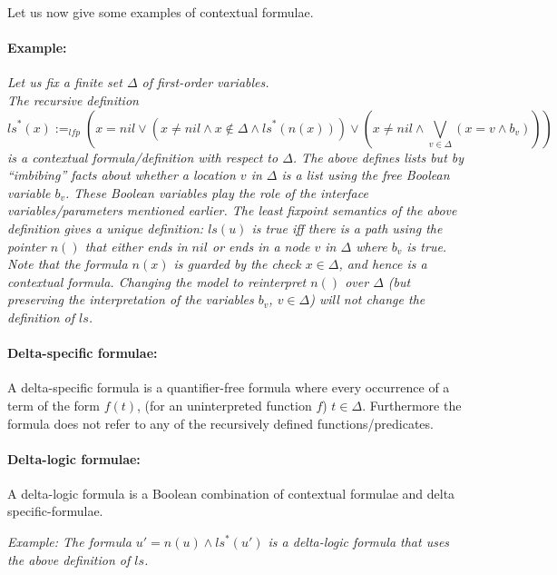 \noindent Let us now give some examples of contextual formulae.

\paragraph{Example:}
\emph{
Let us fix a finite set $\Delta$ of first-order variables.\\
The recursive definition $$\textit{ls}^*(x) :=_{\textit{lfp}} (x=\textit{nil} \vee (x \not = nil \wedge x \not \in \Delta \wedge \textit{ls}^*(n(x))) 
 \vee (x \not = nil \wedge \bigvee_{v \in \Delta} (x\!=\!v \wedge b_v)))$$ 
 is a contextual formula/definition with respect to $\Delta$.
The above defines lists but by ``imbibing'' facts about whether a location $v$ in $\Delta$ is a list using the
free Boolean variable $b_v$. These Boolean variables play the role of the interface variables/parameters mentioned earlier.
The least fixpoint semantics of the above definition gives a unique definition: $ls(u)$ is true iff
there is a path using the pointer $n()$ that either ends in $\textit{nil}$ or ends in a node $v$ in $\Delta$ where $b_v$ is true. 
Note that the formula $n(x)$ is guarded by the check $x \in \Delta$, and hence is a contextual formula.
Changing the model to reinterpret $n()$ over $\Delta$ (but preserving the interpretation of the variables $b_v$, $v \in \Delta$) 
will not change the definition of $\textit{ls}$.
}

\paragraph{Delta-specific formulae:}
A delta-specific formula is a quantifier-free formula where every occurrence of a term of the form $f(t)$, (for an uninterpreted
function $f$) $t \in \Delta$. Furthermore the formula does not refer to any of the recursively defined functions/predicates.

\paragraph{Delta-logic formulae:}
A delta-logic formula is a Boolean combination of contextual formulae and delta specific-formulae.

\emph{Example: The formula $u'\!\!=\!\!n(u) \wedge \textit{ls}^*(u')$ is a delta-logic formula that uses the above definition of $ls$.}






